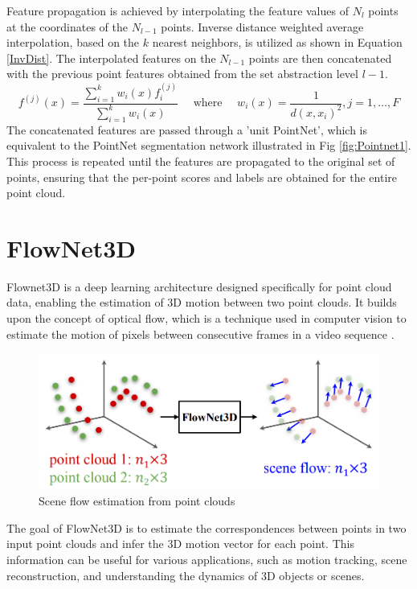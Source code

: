 Feature propagation is achieved by interpolating the feature values of $N_{l}$ points at the coordinates of the $N_{l-1}$ points. Inverse distance weighted average interpolation, based on the $k$ nearest neighbors, is utilized as shown in Equation \ref{InvDist}. The interpolated features on the $N_{l-1}$ points are then concatenated with the previous point features obtained from the set abstraction level $l-1$.
\begin{equation}\label{InvDist}
f^{(j)}(x)=\frac{\sum_{i=1}^k w_i(x) f_i^{(j)}}{\sum_{i=1}^k w_i(x)} \quad \text { where } \quad w_i(x)=\frac{1}{d\left(x, x_i\right)^2}, j=1, \ldots, F
\end{equation}
The concatenated features are passed through a 'unit PointNet', which is equivalent to the PointNet segmentation network illustrated in Fig \ref{fig:Pointnet1}.\\

This process is repeated until the features are propagated to the original set of points, ensuring that the per-point scores and labels are obtained for the entire point cloud.

\section{FlowNet3D}
Flownet3D is a deep learning architecture designed specifically for point cloud data, enabling the estimation of 3D motion between two point clouds. It builds upon the concept of optical flow, which is a technique used in computer vision to estimate the motion of pixels between consecutive frames in a video sequence \cite{FlowNet}.
\begin{figure}[H]
    \centering
    \includegraphics[width=\textwidth]{Img/05_Flow3D.png}
    \caption{Scene flow estimation from point clouds \cite{FlowNet}}
    \label{fig:flow}
\end{figure}
The goal of FlowNet3D is to estimate the correspondences between points in two input point clouds and infer the 3D motion vector for each point. This information can be useful for various applications, such as motion tracking, scene reconstruction, and understanding the dynamics of 3D objects or scenes.

